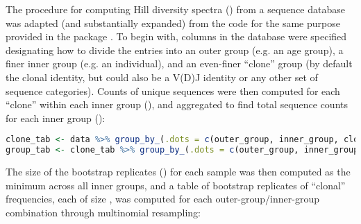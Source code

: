 The procedure for computing Hill diversity spectra () from a  sequence database was adapted (and substantially expanded) from the code for the same purpose provided in the  package  \parencite{gupta2015changeo,stern2014bcells}. To begin with, columns in the database were specified designating how to divide the entries into an outer group (e.g. an age group), a finer inner group (e.g. an individual), and an even-finer ``clone'' group (by default the clonal identity, but could also be a V(D)J identity or any other set of sequence categories). Counts of unique sequences were then computed for each ``clone'' within each inner group (), and aggregated to find total sequence counts for each inner group ():

\begin{lstlisting}[language=R]
clone_tab <- data %>% group_by_(.dots = c(outer_group, inner_group, clone_field)) %>% dplyr::summarize(COUNT = n())
group_tab <- clone_tab %>% group_by_(.dots = c(outer_group, inner_group)) %>% dplyr::summarize_(SEQUENCES = interp(~sum(x, na.rm = TRUE), x = as.name("COUNT")))
\end{lstlisting}

\noindent The size of the bootstrap replicates () for each sample was then computed as the minimum across all inner groups, and a table of  bootstrap replicates of ``clonal'' frequencies, each of size , was computed for each outer-group/inner-group combination through multinomial resampling:

